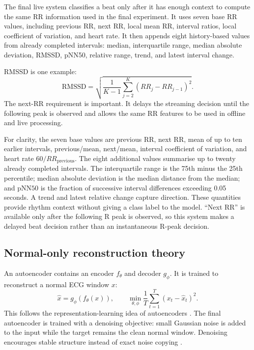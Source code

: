 The final live system classifies a beat only after it has enough context to
compute the same RR information used in the final experiment. It uses seven
base RR values, including previous RR, next RR, local mean RR, interval ratios,
local coefficient of variation, and heart rate. It then appends eight
history-based values from already completed intervals: median, interquartile
range, median absolute deviation, RMSSD, pNN50, relative range, trend, and
latest interval change.

RMSSD is one example:
\begin{equation}
 \mathrm{RMSSD}=\sqrt{\frac{1}{K-1}\sum_{j=2}^{K}(RR_j-RR_{j-1})^2}.
\end{equation}
The next-RR requirement is important. It delays the streaming decision until the following peak is observed and
allows the same RR features to be used in offline and live processing.

For clarity, the seven base values are previous RR, next RR, mean of up to ten
earlier intervals, previous/mean, next/mean, interval coefficient of
variation, and heart rate $60/RR_{\mathrm{previous}}$. The eight additional
values summarise up to twenty already completed intervals. The interquartile
range is the 75th minus the 25th percentile; median absolute deviation is
the median distance from the median; and $\mathrm{pNN50}$ is the fraction of
successive interval differences exceeding 0.05 seconds. A trend and latest
relative change capture direction. These quantities provide rhythm context
without giving a class label to the model. ``Next RR'' is available only after
the following R peak is observed, so this system makes a delayed beat decision
rather than an instantaneous R-peak decision.

\subsection{Normal-only reconstruction theory}

An autoencoder contains an encoder $f_\theta$ and decoder $g_\phi$. It is
trained to reconstruct a normal ECG window $x$:
\begin{equation}
 \hat{x}=g_\phi(f_\theta(x)), \qquad
 \min_{\theta,\phi}\frac{1}{T}\sum_{t=1}^{T}(x_t-\hat{x}_t)^2.
 \label{eq:ae-objective}
\end{equation}
This follows the representation-learning idea of autoencoders
\cite{hinton2006autoencoder}. The final autoencoder is trained with a
denoising objective: small Gaussian noise is added to the input while the
target remains the clean normal window. Denoising encourages stable structure
instead of exact noise copying \cite{vincent2008denoising}.

